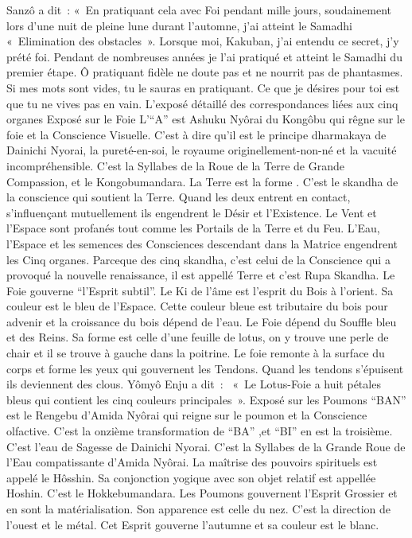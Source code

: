 Sanzô a dit :
 « En pratiquant cela avec Foi pendant mille jours, soudainement lors d’une nuit de pleine lune durant l’automne, j’ai atteint le Samadhi « Elimination des obstacles ».
Lorsque moi, Kakuban,  j’ai entendu ce secret, j'y prété foi. Pendant de nombreuses années je l’ai pratiqué et atteint le Samadhi du premier étape.
Ô pratiquant fidèle ne doute pas et ne nourrit pas de phantasmes. Si mes mots sont vides, tu le sauras en pratiquant. Ce que je désires pour toi est que tu ne vives pas en vain.
L'exposé détaillé des correspondances liées aux cinq organes
Exposé sur le Foie
L'“A” est Ashuku Nyôrai du Kongôbu qui rêgne sur le foie et la Conscience Visuelle. C’est à dire qu’il est le principe dharmakaya de Dainichi Nyorai, la  pureté-en-soi, le royaume originellement-non-né et la vacuité incompréhensible. C’est la Syllabes de la Roue de la Terre de Grande Compassion, et le Kongobumandara. La Terre est la forme . C’est le skandha de la conscience qui soutient la Terre. Quand les deux entrent en contact, s'influençant mutuellement ils engendrent le Désir et l'Existence. Le Vent et l'Espace sont profanés tout comme les Portails de la Terre et du Feu. L'Eau, l'Espace et les semences des Consciences descendant dans la Matrice engendrent les Cinq organes.
Parceque des cinq skandha, c'est celui de la Conscience qui a provoqué la nouvelle renaissance, il est appellé Terre et c'est Rupa Skandha.
Le Foie gouverne “l’Esprit subtil”. Le Ki de l’âme est l’esprit du Bois à l’orient. Sa couleur est le bleu de l'Espace. Cette couleur bleue est tributaire du bois pour advenir et la croissance du bois dépend de l’eau. Le Foie dépend du Souffle bleu et des Reins. Sa forme est celle d’une feuille de lotus, on y trouve une perle de chair et il se trouve à gauche dans la poitrine.
Le foie remonte à la surface du corps et forme les yeux qui gouvernent les Tendons. Quand les tendons s’épuisent ils deviennent des clous.
Yômyô Enju a dit : 
« Le Lotus-Foie a huit pétales bleus qui contient les cinq couleurs principales ».
Exposé sur les Poumons
 “BAN” est le Rengebu d’Amida Nyôrai qui reigne sur le poumon et la Conscience olfactive. C’est la onzième transformation de “BA” ,et “BI” en est la troisième. C’est l’eau de Sagesse de Dainichi Nyorai. C’est la Syllabes de la Grande Roue de l'Eau compatissante d’Amida Nyôrai.
La maîtrise des pouvoirs spirituels est appelé le Hôsshin. Sa conjonction yogique avec son objet relatif est appellée Hoshin. C’est le Hokkebumandara.
Les Poumons gouvernent l’Esprit Grossier et en sont la matérialisation. Son apparence est celle du nez. C’est la direction de l’ouest et le métal. Cet Esprit gouverne l’autumne et sa couleur est le blanc.
